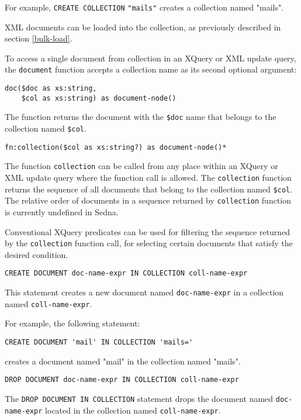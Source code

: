 \documentclass[a4paper,12pt]{article}
\begin{document}
For example, \verb!CREATE COLLECTION! \verb!"mails"! creates a collection named
"mails".

XML documents can be loaded into the collection, as previously described in
section \ref{bulk-load}.

To access a single document from collection in an XQuery or XML update query,
the \verb!document! function accepts a collection name as its second optional
argument:
\begin{verbatim}
doc($doc as xs:string, 
    $col as xs:string) as document-node()
\end{verbatim}
The function returns the document with the \verb!$doc! name that belongs to the
collection named \verb!$col!.

\begin{verbatim}
fn:collection($col as xs:string?) as document-node()*
\end{verbatim}
The function \verb!collection! can be called from any place within an XQuery or
XML update query where the function call is allowed. The \verb!collection!
function returns the sequence of all documents that belong to the collection
named \verb!$col!. The relative order of documents in a sequence returned by
\verb!collection! function is currently undefined in Sedna.

Conventional XQuery predicates can be used for filtering the sequence returned
by the \verb!collection! function call, for selecting certain documents that
satisfy the desired condition.

\begin{verbatim}
CREATE DOCUMENT doc-name-expr IN COLLECTION coll-name-expr
\end{verbatim}

This statement creates a new document named \verb!doc-name-expr! in a collection
named \verb!coll-name-expr!.

For example, the following statement: 
\begin{verbatim}
CREATE DOCUMENT 'mail' IN COLLECTION 'mails='
\end{verbatim}
creates a document named "mail" in the collection named "mails".

\begin{verbatim}
DROP DOCUMENT doc-name-expr IN COLLECTION coll-name-expr
\end{verbatim}

The \verb!DROP DOCUMENT IN COLLECTION! statement drops the document named
\verb!doc-name-expr! located in the collection named \verb!coll-name-expr!.
\end{document}
